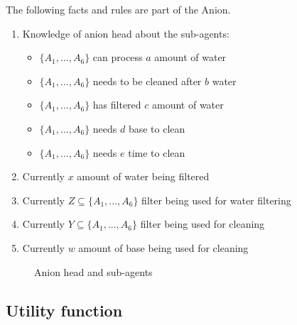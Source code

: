 The following facts and rules are part of the Anion.

\begin{enumerate}
	\item
	Knowledge of anion head about the sub-agents:
	\begin{itemize}
		\item {$\{A_1, ..., A_6\}$ can process $a$ amount of water}
		\item {$\{A_1, ..., A_6\}$ needs to be cleaned after $b$ water}
		\item {$\{A_1, ..., A_6\}$ has filtered $c$ amount of water}
		\item {$\{A_1, ..., A_6\}$ needs $d$ base to clean}
		\item {$\{A_1, ..., A_6\}$ needs $e$ time to clean}
	\end{itemize}
	\item
	Currently $x$ amount of water being filtered 
	\item
	Currently $Z \subseteq \{A_1, ..., A_6\}$ filter being used for water filtering
	\item
	Currently $Y \subseteq \{A_1, ..., A_6\}$ filter being used for cleaning
	\item
	Currently $w$ amount of base being used for cleaning
\end{enumerate}

\begin{figure}[h]
	
	\centering
	\caption{Anion head and sub-agents}
	\label{fig:anion-head-sub}
	
\end{figure}


\subsection{Utility function}
